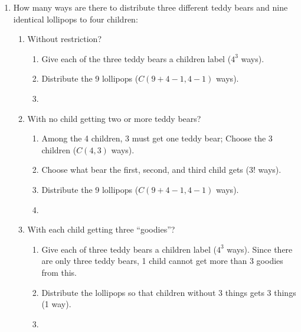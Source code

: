 \documentclass[12pt]{amsart}
\begin{document}
\begin{enumerate}
\pagebreak
\item How many ways are there to distribute three different teddy bears and nine
identical lollipops to four children:
    \begin{enumerate}
        \item Without restriction?
        \begin{enumerate}
            \item Give each of the three teddy bears a children label ($4^3$ ways).
            \item Distribute the 9 lollipops ($C(9+4-1,4-1)$ ways).
            \item {}
        \end{enumerate}
        \item With no child getting two or more teddy bears?
        \begin{enumerate}
            \item Among the 4 children, 3 must get one teddy bear; Choose the 3 children ($C(4,3)$ ways).
            \item Choose what bear the first, second, and third child gets ($3!$ ways).
            \item Distribute the 9 lollipops ($C(9+4-1,4-1)$ ways).
            \item {}
        \end{enumerate}
        \item With each child getting three “goodies”?
        \begin{enumerate}
            \item Give each of three teddy bears a children label ($4^3$ ways). Since there are only three teddy bears, 1 child cannot get more than 3 goodies from this.
            \item Distribute the lollipops so that children without 3 things gets 3 things (1 way).
            \item {}
        \end{enumerate}
    \end{enumerate}
    

\end{enumerate}
\end{document}

